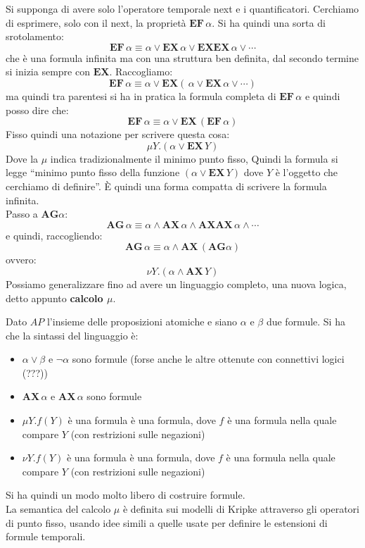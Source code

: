 \documentclass[a4paper,12pt, oneside]{book}
\begin{document}
Si supponga di avere solo l'operatore temporale next e i
quantificatori. Cerchiamo di esprimere, solo con il next, la proprietà
$\mathbf{EF}\,\alpha$. Si ha quindi una sorta di srotolamento:
\[\mathbf{EF}\,\alpha\equiv \alpha\lor
  \mathbf{EX}\,\alpha\lor\mathbf{EXEX}\,\alpha\lor\cdots\]
che è una formula infinita ma con una struttura ben definita, dal secondo
termine si inizia sempre con $\mathbf{EX}$. Raccogliamo:
\[\mathbf{EF}\,\alpha\equiv \alpha\lor
  \mathbf{EX}(\,\alpha\lor\mathbf{EX}\,\alpha\lor\cdots)\]
ma quindi tra parentesi si ha in pratica la formula completa di
$\mathbf{EF}\,\alpha$ e quindi posso dire che:
\[\mathbf{EF}\,\alpha\equiv\alpha\lor\mathbf{EX}\,(\mathbf{EF}\,\alpha)\]
Fisso quindi una notazione per scrivere questa cosa:
\[\mu Y.(\alpha\lor \mathbf{EX}\,Y)\]
Dove la $\mu$ indica tradizionalmente il minimo punto fisso, Quindi la formula
si legge ``minimo punto fisso della funzione $(\alpha\lor \mathbf{EX}\,Y)$ dove
$Y$ è l'oggetto che cerchiamo di definire''. È quindi una forma compatta di
scrivere la formula infinita.\\
Passo a $\mathbf{AG}\alpha$:
\[\mathbf{AG}\,\alpha\equiv \alpha\land
  \mathbf{AX}\,\alpha\land\mathbf{AXAX}\,\alpha\land\cdots\]
e quindi, raccogliendo:
\[\mathbf{AG}\,\alpha\equiv\alpha\land \mathbf{AX}\,(\mathbf{AG}\alpha)\]
ovvero:
\[\nu Y.(\alpha\land\mathbf{AX}\,Y)\]
Possiamo generalizzare fino ad avere un linguaggio completo, una nuova logica,
detto appunto \textbf{calcolo $\mu$}.
\begin{definizione}
  Dato $AP$ l'insieme delle proposizioni atomiche e siano $\alpha$ e $\beta$ due
  formule. Si ha che la sintassi del linguaggio è:
  \begin{itemize}
    \item $\alpha\lor\beta$ e $\neg \alpha$ sono formule (forse anche le altre
    ottenute con connettivi logici (???))
    \item $\mathbf{AX}\,\alpha$ e $\mathbf{AX}\,\alpha$ sono formule
    \item $\mu Y.f(Y)$ è una formula è una formula, dove $f$ è una formula nella
    quale compare $Y$ (con restrizioni sulle negazioni) 
    \item $\nu Y.f(Y)$ è una formula è una formula, dove $f$ è una formula nella
    quale compare $Y$ (con restrizioni sulle negazioni)
  \end{itemize}
  Si ha quindi un modo molto libero di costruire formule.\\
  La semantica del calcolo $\mu$ è definita sui modelli di Kripke attraverso gli
  operatori di punto fisso, usando idee simili a quelle usate per definire le
  estensioni di formule temporali.
\end{definizione}
\end{document}
